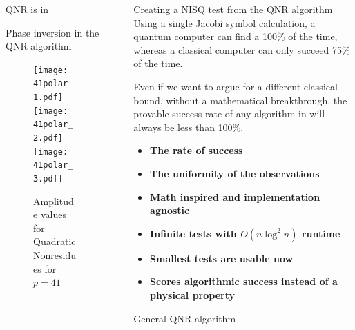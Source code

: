 \documentclass[final]{beamer}
\providecommand{\QNR}{\csword{QNR}}
\newlength{\sepwidth}
\newlength{\colwidth}
\newcommand{\separatorcolumn}{\begin{column}{\sepwidth}\end{column}}
\begin{document}
\begin{frame}[t]
\begin{columns}[t]
\begin{column}{\colwidth}
\begin{exampleblock}{QNR is in \EQPC}
  \end{exampleblock}
  \begin{block}{Phase inversion in the QNR algorithm}
      \centering
    \begin{figure}
      \texttt{[image: 41polar\_1.pdf]}
    \hfill\texttt{[image: 41polar\_2.pdf]}
    \hfill\texttt{[image: 41polar\_3.pdf]}
      \caption{Amplitude values for Quadratic Nonresidues for $p=41$}
    \end{figure}

  \end{block}

\end{column}

\separatorcolumn

\begin{column}{\colwidth}

  \begin{exampleblock}{Creating a NISQ test from the QNR algorithm}
    Using a single Jacobi symbol calculation, a quantum computer can find a \QNR 100\% of the time, 
    whereas a classical computer can only succeed 75\% of the time.

    Even if we want to argue for a different classical bound, without a mathematical breakthrough,
    the provable success rate of any algorithm in \xP will always be less than 100\%.

    \begin{itemize}
      \item {\bf The rate of success}
      \item {\bf The uniformity of the observations}
    \end{itemize}

\begin{itemize}
  \item {\bf Math inspired and implementation agnostic}
  \item {\bf Infinite tests with $O(n \log^2 n)$ runtime} 
  \item {\bf Smallest tests are usable now}
  \item {\bf Scores algorithmic success instead of a physical property}
\end{itemize}
  \end{exampleblock}

  \begin{block}{General QNR algorithm}


\end{block}
\end{column}
\end{columns}
\end{frame}
\end{document}
